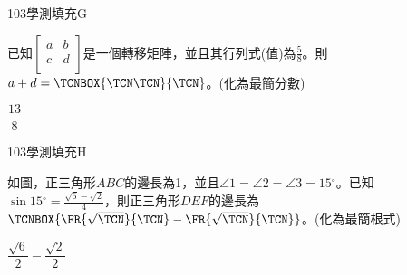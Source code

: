     \begin{QUESTION}
        \begin{ExamInfo}{103}{學測}{填充}{G}
        \end{ExamInfo}
        \begin{ExamAnsRateInfo}{35}{76}{25}{4}
        \end{ExamAnsRateInfo}
        \begin{QBODY}
            已知$\left[ \begin{matrix}
   a & b  \\
   c & d  \\
\end{matrix} \right]$是一個轉移矩陣，並且其行列式(值)為$\frac{5}{8}$。則$a+d=\TCNBOX{\TCN\TCN}{\TCN}$。(化為最簡分數)
        \end{QBODY}
        \begin{QFROMS}
        \end{QFROMS}
        \begin{QTAGS}\end{QTAGS}
        \begin{QANS}
            $\dfrac{13}{8}$
        \end{QANS}
        \begin{QSOLLIST}
        \end{QSOLLIST}
        \begin{QEMPTYSPACE}
        \end{QEMPTYSPACE}
    \end{QUESTION}
    \begin{QUESTION}
        \begin{ExamInfo}{103}{學測}{填充}{H}
        \end{ExamInfo}
        \begin{ExamAnsRateInfo}{28}{64}{18}{2}
        \end{ExamAnsRateInfo}
        \begin{QBODY}
			如圖，正三角形$ABC$的邊長為1，並且$\angle 1=\angle 2=\angle 3=15{}^\circ $。已知$\sin 15{}^\circ =\frac{\sqrt{6}-\sqrt{2}}{4}$，則正三角形$DEF$的邊長為$\TCNBOX{\FR{\sqrt{\TCN}}{\TCN}-\FR{\sqrt{\TCN}}{\TCN}}$。(化為最簡根式)
        \end{QBODY}
        \begin{QFROMS}
        \end{QFROMS}
        \begin{QTAGS}\end{QTAGS}
        \begin{QANS}
            $\dfrac{\sqrt{6}}{2}-\dfrac{\sqrt{2}}{2}$
        \end{QANS}
        \begin{QSOLLIST}
        \end{QSOLLIST}
        \begin{QEMPTYSPACE}
        \end{QEMPTYSPACE}
    \end{QUESTION}
